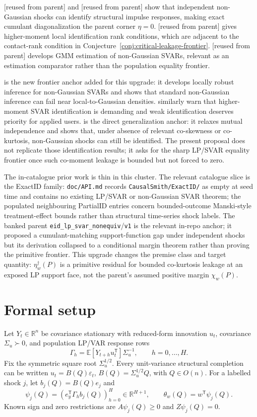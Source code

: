 \documentclass[11pt]{article}
\newcommand{\E}{\mathbb{E}}
\newcommand{\transpose}{\mathsf{T}}
\newcommand{\R}{\mathbb{R}}
\theoremstyle{definition}
\theoremstyle{plain}
\theoremstyle{remark}
\begin{document}
\citet{GourierouxMonfortRenne2017} [reused from parent] and \citet{LanneMeitzSaikkonen2017} [reused from parent] show that independent non-Gaussian shocks can identify structural impulse responses, making exact cumulant diagonalization the parent corner \(\eta=0\).  \citet{Guay2021} [reused from parent] gives higher-moment local identification rank conditions, which are adjacent to the contact-rank condition in Conjecture~\ref{conj:critical-leakage-frontier}.  \citet{LanneLuoto2021} [reused from parent] develops GMM estimation of non-Gaussian SVARs, relevant as an estimation comparator rather than the population equality frontier.

\citet{HoeschLeeMesters2024} is the new frontier anchor added for this upgrade: it develops locally robust inference for non-Gaussian SVARs and shows that standard non-Gaussian inference can fail near local-to-Gaussian densities.  \citet{MontielOleaPlagborgMollerQian2022} similarly warn that higher-moment SVAR identification is demanding and weak identification deserves priority for applied users.  \citet{LanneLiuLuoto2026} is the direct generalization anchor: it relaxes mutual independence and shows that, under absence of relevant co-skewness or co-kurtosis, non-Gaussian shocks can still be identified.  The present proposal does not replicate those identification results; it asks for the sharp LP/SVAR equality frontier once such co-moment leakage is bounded but not forced to zero.

The in-catalogue prior work is thin in this cluster.  The relevant catalogue slice is the ExactID family: \texttt{doc/API.md} records \texttt{CausalSmith/ExactID/} as empty at seed time and contains no existing LP/SVAR or non-Gaussian SVAR theorem; the populated neighbouring PartialID entries concern bounded-outcome Manski-style treatment-effect bounds rather than structural time-series shock labels.  The banked parent \texttt{eid\_lp\_svar\_nonequiv}/\texttt{v1} is the relevant in-repo anchor; it proposed a cumulant-matching support-function gap under independent shocks but its derivation collapsed to a conditional margin theorem rather than proving the primitive frontier.  This upgrade changes the premise class and target quantity: \(\eta_w^\dagger(P)\) is a primitive residual for bounded co-kurtosis leakage at an exposed LP support face, not the parent's assumed positive margin \(\chi_w(P)\).

\section{Formal setup}
Let \(Y_t\in\R^n\) be covariance stationary with reduced-form innovation \(u_t\), covariance \(\Sigma_u\succ0\), and population LP/VAR response rows
\[
\Gamma_h=\E[Y_{t+h}u_t^\transpose]\Sigma_u^{-1},\qquad h=0,\ldots,H.
\]
Fix the symmetric square root \(\Sigma_u^{1/2}\).  Every unit-variance structural completion can be written \(u_t=B(Q)\varepsilon_t\), \(B(Q)=\Sigma_u^{1/2}Q\), with \(Q\in O(n)\).  For a labelled shock \(j\), let \(b_j(Q)=B(Q)e_j\) and
\[
\psi_j(Q)=\left(e_y^\transpose\Gamma_h b_j(Q)\right)_{h=0}^H\in\R^{H+1},
\qquad
\theta_w(Q)=w^\transpose\psi_j(Q).
\]
Known sign and zero restrictions are \(A\psi_j(Q)\ge0\) and \(Z\psi_j(Q)=0\).
\end{document}
